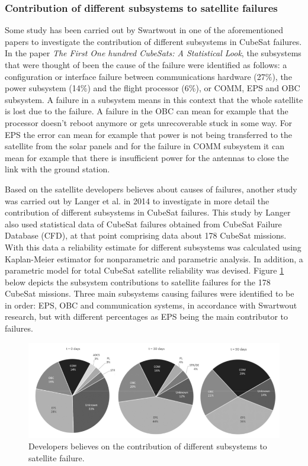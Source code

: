 \documentclass[english,12pt,a4paper,pdftex,elec,utf8]{aaltothesis}
\begin{document}
\subsubsection{Contribution of different subsystems to satellite failures}
Some study has been carried out by Swartwout in one of the aforementioned papers to investigate the contribution of different subsystems in CubeSat failures. In the paper \textit{The First One hundred CubeSats: A Statistical Look}, the subsystems that were thought of been the cause of the failure were identified as follows: a configuration or interface failure between communications hardware (27\%), the power subsystem (14\%) and the flight processor (6\%), or COMM, EPS and OBC subsystem. A failure in a subsystem means in this context that the whole satellite is lost due to the failure. A failure in the OBC can mean for example that the processor doesn't reboot anymore or gets unrecoverable stuck in some way. For EPS the error can mean for example that power is not being transferred to the satellite from the solar panels and for the failure in COMM subsystem it can mean for example that there is insufficient power for the antennas to close the link with the ground station.  \cite{Swart1}\par
Based on the satellite developers believes about causes of failures, another study was carried out by Langer et al. in 2014 to investigate in more detail the contribution of different subsystems in CubeSat failures. This study by Langer also used statistical data of CubeSat failures obtained from CubeSat Failure Database (CFD), at that point comprising data about 178 CubeSat missions. With this data a reliability estimate for different subsystems was calculated using Kaplan-Meier estimator for nonparametric and parametric analysis. In addition, a parametric model for total CubeSat satellite reliability was devised. Figure \ref{subsystemfailures} below depicts the subsystem contributions to satellite failures for the 178 CubeSat missions. Three main subsystems causing failures were identified to be in order: EPS, OBC and communication systems, in accordance with Swartwout research, but with different percentages as EPS being the main contributor to failures. \cite{Swart1, Langer}\par
\begin{figure}[h!]
\includegraphics[scale=0.5]{langersubsystems}
\caption{Developers believes on the contribution of different subsystems to satellite failure. \cite{Langer}}
\label{subsystemfailures}
\end{figure}  
\end{document}
